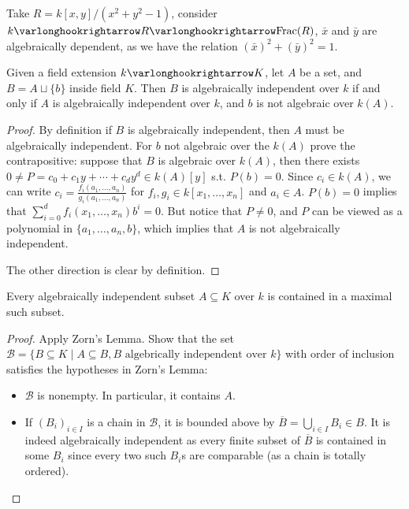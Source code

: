 \documentclass{article}
\begin{document}
\begin{example}
    Take $R = k[x, y]/(x^2 + y^2 - 1)$, consider $k \ext R \ext \Frac(R)$, $\bar{x}$ and $\bar{y}$ are algebraically dependent, as we have the relation $(\bar{x})^2 + (\bar{y})^2 = 1$.
\end{example}

\begin{proposition}\label{prop: transitivity of alg. indep.}
    Given a field extension $k \ext K$, let $A$ be a set, and $B = A \sqcup \{b\}$ inside field $K$. Then $B$ is algebraically independent over $k$ if and only if $A$ is algebraically independent over $k$, and $b$ is not algebraic over $k(A)$.
\end{proposition}

\begin{proof}
    By definition if $B$ is algebraically independent, then $A$ must be algebraically independent. For $b$ not algebraic over the $k(A)$ prove the contrapositive: suppose that $B$ is algebraic over $k(A)$, then there exists $0 \neq P = c_0 + c_1 y + \cdots + c_d y^d \in k(A)[y]$ s.t. $P(b) = 0$. Since $c_i \in k(A)$, we can write $c_i = \frac{f_i (a_1, \dots, a_n)}{g_i (a_1, \dots, a_n)}$ for $f_i, g_i \in k[x_1, \dots, x_n]$ and $a_i \in A$. $P(b) = 0$ implies that $\sum_{i = 0}^d f_i (x_1, \dots, x_n) b^i = 0$. But notice that $P \neq 0$, and $P$ can be viewed as a polynomial in $\{a_1, \dots, a_n, b\}$, which implies that $A$ is not algebraically independent. 

    The other direction is clear by definition.
\end{proof}

\begin{proposition}\label{prop: existence of max alg. indep. subset}
    Every algebraically independent subset $A \subseteq K$ over $k$ is contained in a maximal such subset.
\end{proposition}

\begin{proof}
    Apply Zorn's Lemma. Show that the set $\mathcal{B} = \{B \subseteq K \mid A \subseteq B, \text{$B$ algebrically independent over $k$}\}$ with order of inclusion satisfies the hypotheses in Zorn's Lemma:
    \begin{itemize}
        \item $\mathcal{B}$ is nonempty. In particular, it contains $A$.
        \item If $(B_i)_{i \in I}$ is a chain in $\mathcal{B}$, it is bounded above by $\overline{B} = \bigcup_{i \in I} B_i \in B$. It is indeed algebraically independent as every finite subset of $\overline{B}$ is contained in some $B_i$ since every two such $B_i$s are comparable (as a chain is totally ordered). 
    \end{itemize}
\end{proof}
\end{document}
